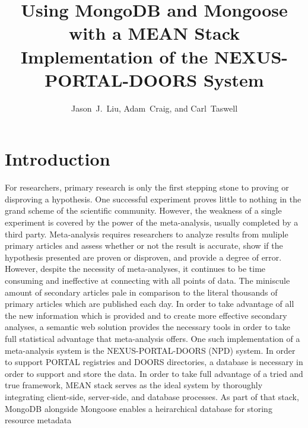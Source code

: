 \documentclass[10pt,twocolumn,twoside]{article}
\date{} %
\author{Jason~J.~Liu, Adam~Craig, and Carl~Taswell}
\title{Using MongoDB and Mongoose with a MEAN Stack Implementation of the NEXUS-PORTAL-DOORS System\\ }
\begin{document}
\maketitle
\thispagestyle{empty}

\section*{Introduction}
\label{secIntroduction}
	For researchers, primary research is only the first stepping stone to proving or disproving a hypothesis. One successful experiment proves little to nothing in the grand scheme of the scientific community. However, the weakness of a single experiment is covered by the power of the meta-analysis, usually completed by a third party. Meta-analysis requires researchers to analyze results from muliple primary articles and assess whether or not the result is accurate, show if the hypothesis presented are proven or disproven, and provide a degree of error. However, despite the necessity of meta-analyses, it continues to be time consuming and ineffective at connecting with all points of data. The miniscule amount of secondary articles pale in comparison to the literal thousands of primary articles which are published each day. In order to take advantage of all the new information which is provided and to create more effective secondary analyses, a semantic web solution provides the necessary tools in order to take full statistical advantage that meta-analysis offers. 
 \newline
	One such implementation of a meta-analysis system is the NEXUS-PORTAL-DOORS (NPD) system. In order to support PORTAL registries and DOORS directories, a database is necessary in order to support and store the data. In order to take full advantage of a tried and true framework, MEAN stack serves as the ideal system by thoroughly integrating client-side, server-side, and database processes. As part of that stack, MongoDB alongside Mongoose enables a heirarchical database for storing resource metadata 
\end{document}

